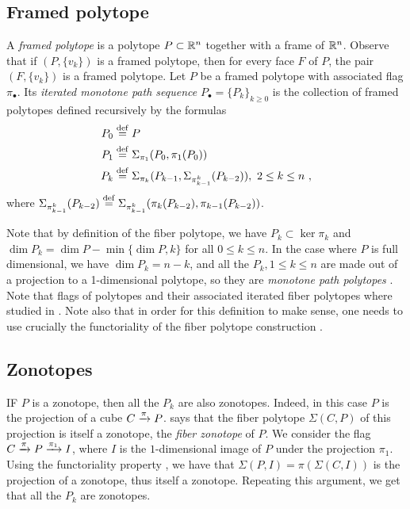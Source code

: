 \subsection{Framed polytope}

A \textit{framed polytope} is a polytope $P \subset \mathbb{R}^n$ together with a frame of $\mathbb{R}^n$.
Observe that if $(P, \{v_k\})$ is a framed polytope, then for every face $F$ of $P$, the pair $(F, \{v_k\})$ is a framed polytope.
Let $P$ be a framed polytope with associated flag $\pi_\bullet$.
Its \textit{iterated monotone path sequence} $P_\bullet = \{P_k\}_{k \geq 0}$ is the collection of framed polytopes defined recursively by the formulas
\begin{align*}
	P_0 & \stackrel{\mathrm{def}}{=} P \\
	P_1 & \stackrel{\mathrm{def}}{=} \Sigma_{\pi_1}(P_0,\pi_1(P_0)) \\
	P_k & \stackrel{\mathrm{def}}{=} \Sigma_{\pi_k}(P_{k-1},\Sigma_{\pi^{k}_{k-1}}(P_{k-2})), \ 2 \leq k \leq n \ ,
\end{align*}
where $\Sigma_{\pi^{k}_{k-1}}(P_{k-2})\stackrel{\mathrm{def}}{=} \Sigma_{\pi^{k}_{k-1}}(\pi_k(P_{k-2}),\pi_{k-1}(P_{k-2}))$.


Note that by definition of the fiber polytope, we have $P_k \subset \ker \pi_k$ and $\dim P_k = \dim P - \min\{ \dim P,k\}$ for all $0\leq k \leq n$.
In the case where $P$ is full dimensional, we have $\dim P_k = n-k$, and all the $P_k, 1 \leq k \leq n$ are made out of a projection to a 1-dimensional polytope, so they are \emph{monotone path polytopes} \cite[Theorem 5.3]{BilleraSturmfels92}.
Note that flags of polytopes and their associated iterated fiber polytopes where studied in \cite{BilleraSturmfels94}.
Note also that in order for this definition to make sense, one needs to use crucially the functoriality of the fiber polytope construction \cite[Lemma 2.3]{BilleraSturmfels92}.

\subsection{Zonotopes} \label{ss:zonotopes}

IF $P$ is a zonotope, then all the $P_k$ are also zonotopes.
Indeed, in this case $P$ is the projection of a cube $C \xrightarrow{\pi} P$.
\cite[Theorem 4.1]{BilleraSturmfels92} says that the fiber polytope $\Sigma(C,P)$ of this projection is itself a zonotope, the \emph{fiber zonotope} of $P$.
We consider the flag $C \xrightarrow{\pi} P \xrightarrow{\pi_1} I$, where $I$ is the $1$-dimensional image of $P$ under the projection $\pi_1$.
Using the functoriality property \cite[Lemma 2.3]{BilleraSturmfels92}, we have that $\Sigma(P,I)=\pi(\Sigma(C,I))$ is the projection of a zonotope, thus itself a zonotope.
Repeating this argument, we get that all the $P_k$ are zonotopes.

